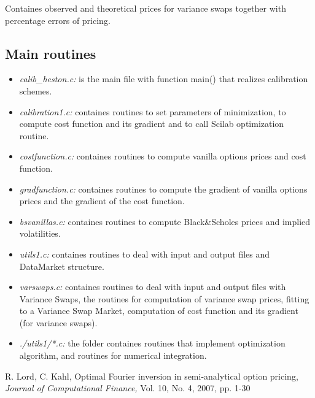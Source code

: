 \documentclass[12pt,amsfonts,enumerate,amscd]{amsart}
\numberwithin{table}{section}
\numberwithin{equation}{section}
\begin{document}
Containes observed and theoretical prices for variance swaps together with  percentage errors of pricing.


\subsection{Main routines}

\begin{itemize}
\item \textit{calib\_heston.c:} is the
main file with function main() that realizes calibration schemes.

\item \textit{calibration1.c:}
containes routines to set parameters of minimization, to compute cost function and its gradient and to call Scilab optimization routine.

\item \textit{costfunction.c:}
containes routines to compute vanilla options prices and cost function.
 
\item \textit{gradfunction.c:}
containes routines to compute the gradient of vanilla options prices and the gradient of the cost function.

\item \textit{bsvanillas.c:}
containes routines to compute Black\&Scholes prices and implied volatilities.

\item \textit{utils1.c:}
containes routines to deal with input and output files and DataMarket structure.
 
\item \textit{varswaps.c:}
containes routines to deal with input and output files with Variance Swaps, the routines for computation of variance swap prices, fitting to a Variance Swap Market, computation of cost function and its gradient (for variance swaps).

\item \textit{./utils1/*.c:} the folder containes routines that implement optimization algorithm, and routines for numerical integration.
\end{itemize}

\begin{thebibliography}{000}

R. Lord, C. Kahl, Optimal Fourier inversion in semi-analytical option pricing, {\em Journal of Computational Finance,}  Vol. 10, No. 4, 2007, pp. 1-30

\end{thebibliography}
\end{document}
